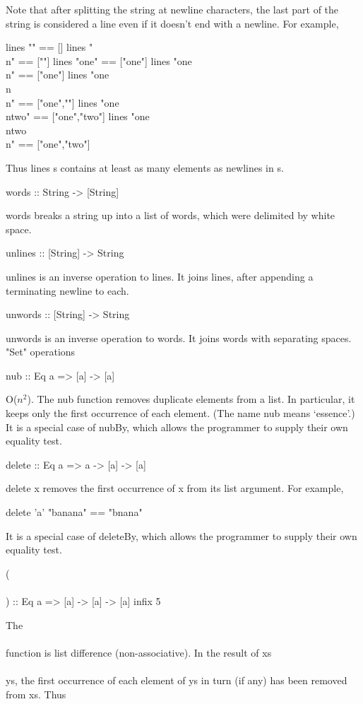 Note that after splitting the string at newline characters, the last part of the string is considered a line even if it doesn't end with a newline. For example,

lines "" == []
lines "\\n" == [""]
lines "one" == ["one"]
lines "one\\n" == ["one"]
lines "one\\n\\n" == ["one",""]
lines "one\\ntwo" == ["one","two"]
lines "one\\ntwo\\n" == ["one","two"]

Thus lines s contains at least as many elements as newlines in s.

words :: String -> [String]

words breaks a string up into a list of words, which were delimited by white space.

unlines :: [String] -> String

unlines is an inverse operation to lines. It joins lines, after appending a terminating newline to each.

unwords :: [String] -> String

unwords is an inverse operation to words. It joins words with separating spaces.
"Set" operations

nub :: Eq a => [a] -> [a]

O($n^2$). The nub function removes duplicate elements from a list. In particular, it keeps only the first occurrence of each element. (The name nub means `essence'.) It is a special case of nubBy, which allows the programmer to supply their own equality test.

delete :: Eq a => a -> [a] -> [a]

delete x removes the first occurrence of x from its list argument. For example,

delete 'a' "banana" == "bnana"

It is a special case of deleteBy, which allows the programmer to supply their own equality test.

(\\\\) :: Eq a => [a] -> [a] -> [a] infix 5

The \\\\ function is list difference (non-associative). In the result of xs \\\\ ys, the first occurrence of each element of ys in turn (if any) has been removed from xs. Thus

